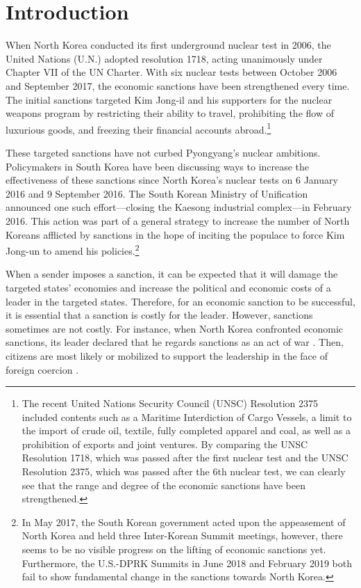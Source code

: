 \documentclass[12pt,]{article}
\begin{document}
\vskip -8.5pt



\noindent \doublespacing 

\hypertarget{introduction}{%
\section{Introduction}\label{introduction}}

When North Korea conducted its first underground nuclear test in 2006,
the United Nations (U.N.) adopted resolution 1718, acting unanimously
under Chapter VII of the UN Charter. With six nuclear tests between
October 2006 and September 2017, the economic sanctions have been
strengthened every time. The initial sanctions targeted Kim Jong-il and
his supporters for the nuclear weapons program by restricting their
ability to travel, prohibiting the flow of luxurious goods, and freezing
their financial accounts abroad.\footnote{The recent United Nations
  Security Council (UNSC) Resolution 2375 included contents such as a
  Maritime Interdiction of Cargo Vessels, a limit to the import of crude
  oil, textile, fully completed apparel and coal, as well as a
  prohibition of exports and joint ventures. By comparing the UNSC
  Resolution 1718, which was passed after the first nuclear test and the
  UNSC Resolution 2375, which was passed after the 6th nuclear test, we
  can clearly see that the range and degree of the economic sanctions
  have been strengthened.}

These targeted sanctions have not curbed Pyongyang's nuclear ambitions.
Policymakers in South Korea have been discussing ways to increase the
effectiveness of these sanctions since North Korea's nuclear tests on 6
January 2016 and 9 September 2016. The South Korean Ministry of
Unification announced one such effort---closing the Kaesong industrial
complex---in February 2016. This action was part of a general strategy
to increase the number of North Koreans afflicted by sanctions in the
hope of inciting the populace to force Kim Jong-un to amend his
policies.\footnote{In May 2017, the South Korean government acted upon
  the appeasement of North Korea and held three Inter-Korean Summit
  meetings, however, there seems to be no visible progress on the
  lifting of economic sanctions yet. Furthermore, the U.S.-DPRK Summits
  in June 2018 and February 2019 both fail to show fundamental change in
  the sanctions towards North Korea.}

When a sender imposes a sanction, it can be expected that it will damage
the targeted states' economies and increase the political and economic
costs of a leader in the targeted states. Therefore, for an economic
sanction to be successful, it is essential that a sanction is costly for
the leader. However, sanctions sometimes are not costly. For instance,
when North Korea confronted economic sanctions, its leader declared that
he regards sanctions as an act of war \citep{frank2006a}. Then, citizens
are most likely or mobilized to support the leadership in the face of
foreign coercion \citep{cortright2002a}.
\end{document}
